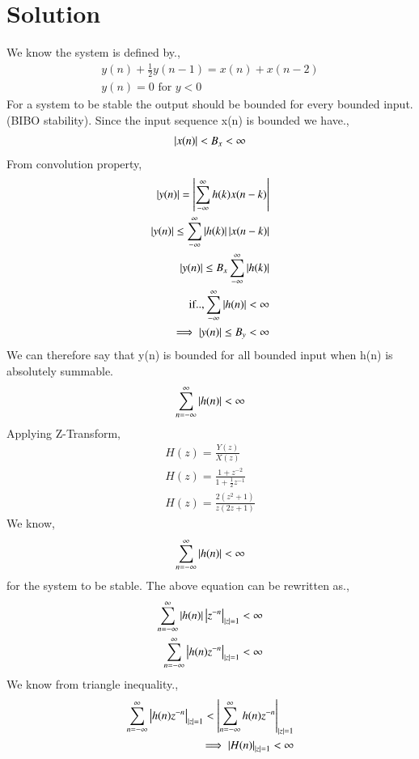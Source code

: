 \documentclass[journal,12pt,twocolumn]{IEEEtran}
\begin{document}
\section{Solution}
We know the system is defined by.,
\begin{align}
\label{eq:system}
y(n)+\frac{1}{2}y(n-1) = x(n)+x(n-2) \\
y(n)=0 \text{ for }y<0
\end{align}
For a system to be stable the output should be bounded for every bounded input.(BIBO stability).
Since the input sequence x(n) is bounded we have.,
\begin{align}
    \left\vert x(n)\right\vert<B_x<\infty
\end{align}
From convolution property,
\begin{align}
 \left\vert y(n)\right\vert = \left\vert\sum_{-\infty}^{\infty}h(k)x(n-k)\right\vert\\
 \left\vert y(n)\right\vert \leq \sum_{-\infty}^{\infty}\left\vert h(k)\right\vert\left\vert x(n-k)\right\vert\\
 \left\vert y(n)\right\vert \leq B_x\sum_{-\infty}^{\infty}\left\vert h(k)\right\vert\\
 \text{if..,}
 \sum_{-\infty}^{\infty}\left\vert h(n)\right\vert < 
\infty \\
\implies \left\vert y(n)\right\vert \leq B_y < \infty 
\end{align}
We can therefore say that y(n) is bounded for all bounded input when h(n) is absolutely summable.\\
\begin{align}
\sum_{n=-\infty}^{\infty} \left\vert h(n)\right\vert < \infty
\end{align}
Applying Z-Transform, 
\begin{align}
H(z) = \frac{Y(z)}{X(z)}\\
H(z) = \frac{1+z^{-2}}{1+\frac{1}{2}z^{-1}}\\
H(z) = \frac{2(z^2+1)}{z(2z+1)} \label{eq:Z Transform}
\end{align}
We know,
\begin{align}
    \sum_{n=-\infty}^{\infty}\left\vert h(n)\right\vert<\infty
\end{align}
for the system to be stable.
The above equation can be rewritten as.,
\begin{align}
    \sum_{n=-\infty}^{\infty}\left\vert h(n)\right\vert\left\vert z^{-n}\right\vert_{\left\vert z\right\vert=1}<\infty\\
    \sum_{n=-\infty}^{\infty}\left\vert h(n)z^{-n}\right\vert_{\left\vert z\right\vert=1}<\infty
\end{align}
We know from triangle inequality.,
\begin{align}
   \sum_{n=-\infty}^{\infty}\left\vert h(n)z^{-n}\right\vert_{\left\vert z\right\vert=1}<\left\vert\sum_{n=-\infty}^{\infty}h(n)z^{-n}\right\vert_{\left\vert z\right\vert=1} \\
   \implies \left\vert H(n)\right\vert_{\left\vert z\right\vert=1}<\infty
\end{align}
\end{document}
